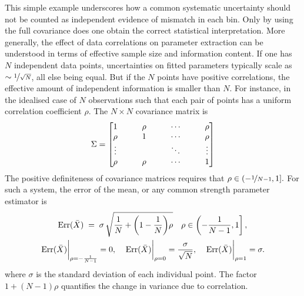     This simple example underscores how a common systematic uncertainty should not be counted as independent evidence of mismatch in each bin.
    Only by using the full covariance does one obtain the correct statistical interpretation.
    More generally, the effect of data correlations on parameter extraction can be understood in terms of effective sample size and information content.
    If one has $N$ independent data points, uncertainties on fitted parameters typically scale as $\sim \nicefrac1{\sqrt{N}}$, all else being equal.
    But if the $N$ points have positive correlations, the effective amount of independent information is smaller than $N$.
    For instance, in the idealised case of \(N\) observations such that each pair of points has a uniform correlation coefficient \(\rho\).
    The \(N\times N\) covariance matrix is
    \[
        {
            \setlength{\arraycolsep}{1.5em}
            \Sigma =    \mqty[1      & \rho & \cdots & \rho \\
                                \rho   & 1    & \cdots & \rho \\
                                \vdots &      & \ddots & \vdots\\
                                \rho   & \rho & \cdots & 1
                                ]
        }
    \]
    The positive definiteness of covariance matrices requires that \(\rho\in(-\nicefrac{1}{N-1}, 1].\)
    For such a system, the error of the mean, or any common strength parameter estimator is
    \begin{gather}
        \label{eq:effective-N}
        \mathrm{Err}(\bar{X}) \;=\; \sigma\,\sqrt{\frac1N + \qty(1 - \frac1N)\rho}\quad\rho\in\left(-\frac1{N-1}, 1\right],\\
       \eval{\mathrm{Err}(\bar{X})}_{\rho=-\frac{1}{N-1}} = 0,\quad
       \eval{\mathrm{Err}(\bar{X})}_{\rho=0} = \frac{\sigma}{\sqrt{N}}, \quad \eval{\mathrm{Err}(\bar{X})}_{\rho = 1} = \sigma.
    \end{gather}
    where $\sigma$ is the standard deviation of each individual point.
    The factor $1+(N-1)\rho$ quantifies the change in variance due to correlation.

